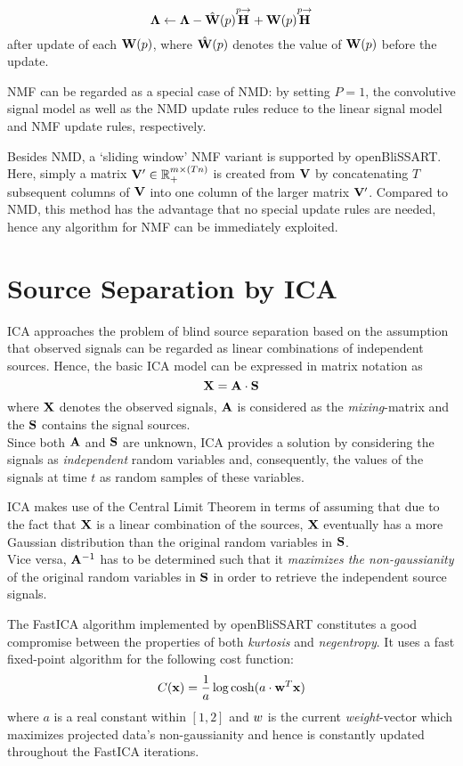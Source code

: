 \begin{equation}
    \label{math:LambdaUpdate}
    \mathbf{\Lambda} \leftarrow \mathbf{\Lambda} - \hat{\mathbf{W}}(p) \overset{p \rightarrow}{\mathbf{H}} + \mathbf{W}(p) \overset{p \rightarrow}{\mathbf{H}}
\end{equation}
after update of each $\mathbf{W}(p)$, where $\hat{\mathbf{W}}(p)$ denotes the value of $\mathbf{W}(p)$ before the update.

NMF can be regarded as a special case of NMD: by setting $P=1$, the
convolutive signal model as well as the NMD update rules reduce to the linear
signal model and NMF update rules, respectively.

Besides NMD, a `sliding window' NMF variant \cite{Gemmeke2010} is supported by
openBliSSART. Here, simply a matrix $\mathbf{V}' \in \mathbb{R}_+^{m \times (Tn)}$ is
created from $\mathbf{V}$ by concatenating $T$ subsequent columns of $\mathbf{V}$
into one column of the larger matrix $\mathbf{V}'$. Compared to NMD, this method
has the advantage that no special update rules are needed, hence any algorithm
for NMF can be immediately exploited.


\section{Source Separation by ICA}

ICA approaches the problem of blind source separation based on the assumption
that observed signals can be regarded as linear combinations of independent
sources. Hence, the basic ICA model can be expressed in matrix notation as
\begin{equation}
    \label{math:ICAModel}
    \mathbf{X} = \mathbf{A} \cdot \mathbf{S}
\end{equation}
where $\mathbf{X}$ denotes the observed signals, $\mathbf{A}$ is considered as the {\em mixing}-matrix and the $\mathbf{S}$ contains the signal sources.
\\
Since both $\mathbf{A}$ and $\mathbf{S}$ are unknown, ICA provides a solution by considering the signals as
\emph{independent} random variables and, consequently, the values of the
signals at time $t$ as random samples of these variables.

ICA makes use of the Central Limit Theorem in terms of assuming that due to the
fact that $\mathbf{X}$ is a linear combination of the sources, $\mathbf{X}$ eventually has a more
Gaussian distribution than the original random variables in $\mathbf{S}$.\\ 
Vice versa, $\mathbf{A}^{-1}$ has to be determined such that it \emph{maximizes the
non-gaussianity} of the original random variables in $\mathbf{S}$ in order to retrieve
the independent source signals.

The FastICA algorithm implemented by openBliSSART \cite{Hyvaerinen1998} constitutes a good compromise between the properties of both {\em kurtosis} and
{\em negentropy}. It uses a fast fixed-point algorithm for the following cost function:
\[
    C(\mathbf{x}) = \frac{1}{a} \log \cosh (a \cdot \mathbf{w}^T
    \mathbf{x})
\]
\noindent where $a$ is a real constant within $[1,2]$ and $\boldmath{w}$ is the
current \emph{weight}-vector which maximizes projected data's non-gaussianity
and hence is constantly updated throughout the FastICA iterations.

